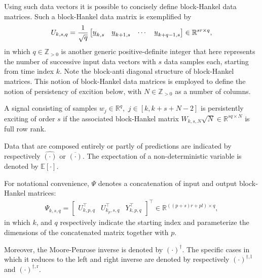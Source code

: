 Using such data vectors it is possible to concisely define block-Hankel data matrices. Such a block-Hankel data matrix is exemplified by
\begin{align*}
    U_{k,s,q} = \frac{1}{\sqrt{q}}\begin{bmatrix}
        \underline{u}_{k,s} & \underline{u}_{k+1,s} & \cdots & \underline{u}_{k+q-1,s}
    \end{bmatrix}\in\mathbb{R}^{sr\times q},
\end{align*}
in which $q\in\mathbb{Z}_{>0}$ is another generic positive-definite integer that here represents the number of successive input data vectors with $s$ data samples each, starting from time index $k$. Note the block-anti diagonal structure of block-Hankel matrices. This notion of block-Hankel data matrices is employed to define the notion of persistency of excition below, with $N\in\mathbb{Z}_{>0}$ as a number of columns.
%
\begin{defn}\label{def:PE}\citep[Def.~10.1]{Verhaegen2007a} A signal consisting of samples ${w_j\!\in\!\mathbb{R}^q},$ $j\!\in\![k,k+s+N-2]$ is persistently exciting of order $s$ if the associated block-Hankel matrix ${ W_{k,s,N}\sqrt{N}\in\mathbb{R}^{sq \times N}}$ is full row rank.
\end{defn}
Data that are composed entirely or partly of predictions are indicated by respectively $\hat{(\cdot)}$ or $\overline{(\cdot)}$. The expectation of a non-deterministic variable is denoted by $\mathbb{E}[\cdot]$.
%

For notational convenience, $\Psi$ denotes a concatenation of input and output block-Hankel matrices:%
\begin{align}\label{eq:Psi_def}
    \Psi_{k,s,q} = \begin{bmatrix}
        U_{k,p,q}^\top & U_{k_p,s,q}^\top & Y_{k,p,q}^\top
    \end{bmatrix}^\top\in\mathbb{R}^{((p+s)r+pl)\times q},
\end{align}
in which $k$, and $q$ respectively indicate the starting index and parameterize the dimensions of the concatenated matrix together with $p$.

Moreover, the Moore-Penrose inverse is denoted by $(\cdot)^\dagger$. The specific cases in which it reduces to the left and right inverse are denoted by respectively $(\cdot)^{\dagger,\mathrm{l}}$ and $(\cdot)^{\dagger,\mathrm{r}}$.


